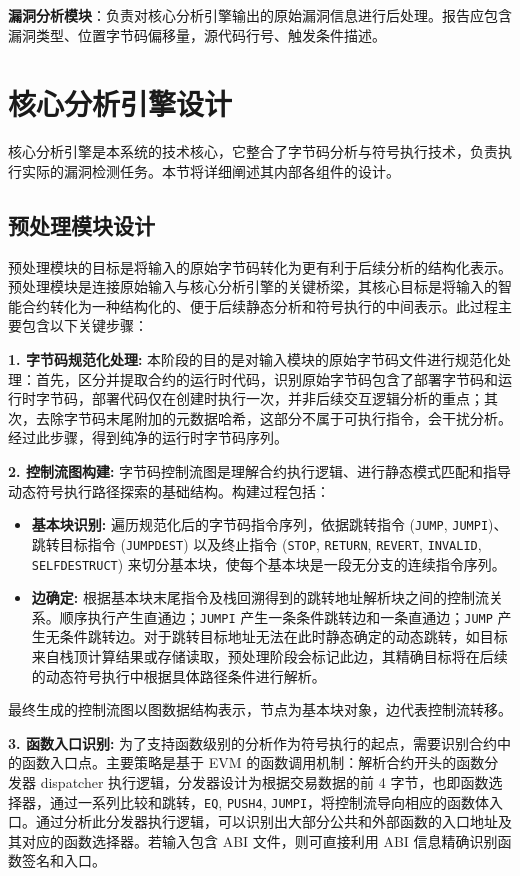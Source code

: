 \documentclass[print, master, vlined, timesmath]{DissertUESTC}
\begin{document}
\textbf{漏洞分析模块}：负责对核心分析引擎输出的原始漏洞信息进行后处理。报告应包含漏洞类型、位置字节码偏移量，源代码行号、触发条件描述。


\section{核心分析引擎设计}

核心分析引擎是本系统的技术核心，它整合了字节码分析与符号执行技术，负责执行实际的漏洞检测任务。本节将详细阐述其内部各组件的设计。

\subsection{预处理模块设计}

预处理模块的目标是将输入的原始字节码转化为更有利于后续分析的结构化表示。
预处理模块是连接原始输入与核心分析引擎的关键桥梁，其核心目标是将输入的智能合约转化为一种结构化的、便于后续静态分析和符号执行的中间表示。此过程主要包含以下关键步骤：


\textbf{1. 字节码规范化处理:}
本阶段的目的是对输入模块的原始字节码文件进行规范化处理：首先，区分并提取合约的运行时代码，识别原始字节码包含了部署字节码和运行时字节码，部署代码仅在创建时执行一次，并非后续交互逻辑分析的重点；其次，去除字节码末尾附加的元数据哈希，这部分不属于可执行指令，会干扰分析。经过此步骤，得到纯净的运行时字节码序列。

\textbf{2. 控制流图构建:}
字节码控制流图是理解合约执行逻辑、进行静态模式匹配和指导动态符号执行路径探索的基础结构。构建过程包括：
\begin{itemize}
    \item \textbf{基本块识别:} 遍历规范化后的字节码指令序列，依据跳转指令 (\texttt{JUMP}, \texttt{JUMPI})、跳转目标指令 (\texttt{JUMPDEST}) 以及终止指令 (\texttt{STOP}, \texttt{RETURN}, \texttt{REVERT}, \texttt{INVALID}, \texttt{SELFDESTRUCT}) 来切分基本块，使每个基本块是一段无分支的连续指令序列。
    \item \textbf{边确定:} 根据基本块末尾指令及栈回溯得到的跳转地址解析块之间的控制流关系。顺序执行产生直通边；\texttt{JUMPI} 产生一条条件跳转边和一条直通边；\texttt{JUMP} 产生无条件跳转边。对于跳转目标地址无法在此时静态确定的动态跳转，如目标来自栈顶计算结果或存储读取，预处理阶段会标记此边，其精确目标将在后续的动态符号执行中根据具体路径条件进行解析。
\end{itemize}
最终生成的控制流图以图数据结构表示，节点为基本块对象，边代表控制流转移。

\textbf{3. 函数入口识别:}
为了支持函数级别的分析作为符号执行的起点，需要识别合约中的函数入口点。主要策略是基于 EVM 的函数调用机制：解析合约开头的函数分发器 dispatcher 执行逻辑，分发器设计为根据交易数据的前 4 字节，也即函数选择器，通过一系列比较和跳转，\texttt{EQ}, \texttt{PUSH4}, \texttt{JUMPI}，将控制流导向相应的函数体入口。通过分析此分发器执行逻辑，可以识别出大部分公共和外部函数的入口地址及其对应的函数选择器。若输入包含 ABI 文件，则可直接利用 ABI 信息精确识别函数签名和入口。
\end{document}
